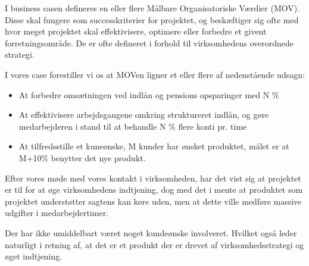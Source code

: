 I business casen defineres en eller flere Målbare Organisatoriske Værdier (MOV).
Disse skal fungere som successkriterier for projektet, og beskæftiger sig
ofte med hvor meget projektet skal effektivisere, optimere eller forbedre et
givent forretningsområde. De er ofte defineret i forhold til virksomhedens
overordnede strategi.

I vores case forestiller vi os at MOVen ligner et eller flere af nedenstående
udsagn:

\begin{itemize}
  \item At forbedre omsætningen ved indlån og pensions opsparinger med N \%

  \item At effektivisere arbejdsgangene omkring struktureret indlån, og gøre
medarbejderen i stand til at behandle N \% flere konti pr. time

  \item At tilfredsstille et kuneønske, M kunder har ønsket produktet, målet er at
M+10\% benytter det nye produkt.
\end{itemize}

Efter vores møde med vores kontakt i virksomheden, har det vist sig at projektet er til
for at øge virksomhedens indtjening, dog med det i mente at produktet som
projektet understøtter sagtens kan køre uden, men at dette ville medføre
massive udgifter i medarbejdertimer.

Der har ikke umiddelbart været noget kundeønske involveret. Hvilket også leder
naturligt i retning af, at det er et produkt der er drevet af virksomhedsstrategi
og øget indtjening.
